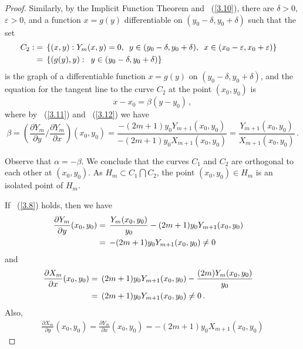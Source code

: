 \documentclass[10pt,a4paper]{amsart}
\begin{document}
\begin{proof}
Similarly, by the Implicit Function Theorem and ~(\ref{3.10}), there are $\delta > 0$, $\varepsilon > 0$, and a function $x = g(y)$
differentiable on $(y_0-\delta,y_0+\delta)$ such that the set
\begin{equation} \notag \begin{split} C_2 : & = \, \{(x,y): Y_m(x,y) = 0, \enskip y \in (y_0-\delta,y_0+\delta), \enskip x \in (x_0-\varepsilon,x_0+\varepsilon)\} \cr
& = \, \{(g(y),y): \enskip y \in (y_0-\delta,y_0+\delta)\} \cr \end{split}
\end{equation}
is the graph of a differentiable function $x = g(y)$ on $(y_0-\delta,y_0+\delta)$, and the equation for the tangent line to the curve $C_2$ at the point $(x_0,y_0)$ is
$$x-x_0 = \beta(y-y_0)\,,$$
where by ~(\ref{3.11}) and ~(\ref{3.12}) we have
$$\beta  = \left( \frac{\partial{Y_m}}{\partial y} \Big / \frac{\partial{Y_m}}{{\partial x}} \right)(x_0,y_0)
= \frac{-(2m+1)y_0Y_{m+1}(x_0,y_0)}{-(2m+1)y_0X_{m+1}(x_0,y_0)} = \frac{Y_{m+1}(x_0,y_0)}{X_{m+1}(x_0,y_0)}\,.$$

Observe that $\alpha = -\beta$. We conclude that the curves $C_1$ and $C_2$ are orthogonal to each other at $(x_0,y_0)$. As $H_m \subset C_1 \bigcap C_2$,
the point $(x_0,y_0) \in H_m$ is an isolated point of $H_m$.

If ~(\ref{3.8}) holds, then we have
\begin{equation}\label{3.13}\begin{split} \frac{\partial{Y_m}}{\partial y}(x_0,y_0) & = \, \frac{Y_m(x_0,y_0)}{y_0} - (2m+1)y_0Y_{m+1}(x_0,y_0) \cr
& = \, -(2m+1)y_0Y_{m+1}(x_0,y_0) \neq 0 \cr \end{split}
\end{equation}
and
\begin{equation}\label{3.14} \begin{split} \frac{\partial{X_m}}{\partial x}(x_0,y_0) & = \, (2m+1)y_0Y_{m+1}(x_0,y_0) - \frac{(2m)Y_m(x_0,y_0)}{y_0} \cr
& = \, (2m+1)y_0Y_{m+1}(x_0,y_0) \neq 0\,. \end{split}
\end{equation}
Also,
\begin{equation}\label{3.15} \begin{split} \frac{\partial{X_m}}{\partial y}(x_0,y_0) =  \frac{\partial{Y_m}}{\partial x}(x_0,y_0) = -(2m+1)y_0X_{m+1}(x_0,y_0) \end{split}
\end{equation}


\end{proof}
\end{document}
